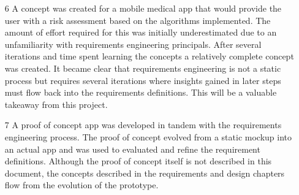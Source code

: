 \begin{itemize}
\item[6] A concept was created for a mobile medical app that would provide the user with a risk assessment based on the algorithms implemented. The amount of effort required for this was initially underestimated due to an unfamiliarity with requirements engineering principals. After several iterations and time spent learning the concepts a relatively complete concept was created. It became clear that requirements engineering is not a static process but requires several iterations where insights gained in later steps must flow back into the requirements definitions. This will be a valuable takeaway from this project.

\item[7] A proof of concept app was developed in tandem with the requirements engineering process. The proof of concept evolved from a static mockup into an actual app and was used to evaluated and refine the requirement definitions. Although the proof of concept itself is not described in this document, the concepts described in the requirements and design chapters flow from the evolution of the prototype.

\end{itemize}

